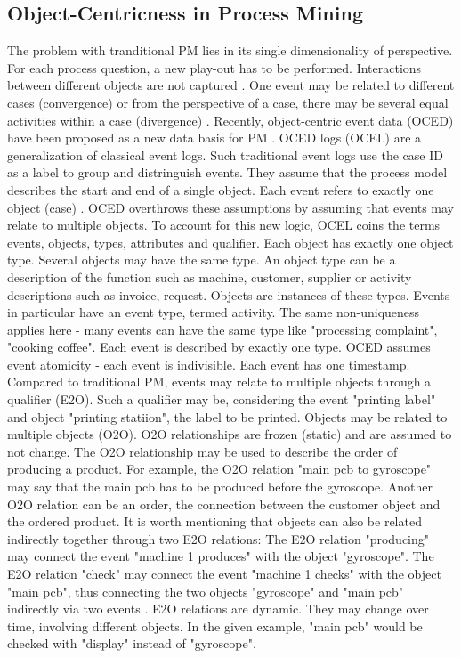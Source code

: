
\subsection{Object-Centricness in Process Mining}
\label{sec:object-centric-event-logs}

The problem with tranditional PM lies in its single dimensionality of perspective. For each process question, a new play-out has to be performed. Interactions between different objects are not captured \autocite{van2023object}. One event may be related to different cases (convergence) or from the perspective of a case, there may be several equal activities within a case (divergence) \autocite{van2019object}.
Recently, object-centric event data (OCED) have been proposed as a new data basis for PM \autocite{van2019object}. OCED logs (OCEL) are a generalization of classical event logs. Such traditional event logs use the case ID as a label to group and distringuish events. They assume that the process model describes the start and end of a single object. Each event refers to exactly one object (case) \autocite{van2023object}. OCED overthrows these assumptions by assuming that events may relate to multiple objects. To account for this new logic, OCEL coins the terms events, objects, types, attributes and qualifier. Each object has exactly one object type. Several objects may have the same type. An object type can be a description of the function such as machine, customer, supplier or activity descriptions such as invoice, request. Objects are instances of these types. Events in particular have an event type, termed activity. The same non-uniqueness applies here - many events can have the same type like "processing complaint", "cooking coffee". Each event is described by exactly one type. OCED assumes event atomicity - each event is indivisible. Each event has one timestamp. Compared to traditional PM, events may relate to multiple objects through a qualifier (E2O). Such a qualifier may be, considering the event "printing label" and object "printing statiion", the label to be printed. Objects may be related to multiple objects (O2O). O2O relationships are frozen (static) and are assumed to not change. The O2O relationship may be used to describe the order of producing a product. For example, the O2O relation "main pcb to gyroscope" may say that the main pcb has to be produced before the gyroscope. Another O2O relation can be an order, the connection between the customer object and the ordered product. It is worth mentioning that objects can also be related indirectly together through two E2O relations: The E2O relation "producing" may connect the event "machine 1 produces" with the object "gyroscope". The E2O relation "check" may connect the event "machine 1 checks" with the object "main pcb", thus connecting the two objects "gyroscope" and "main pcb" indirectly via two events \autocite{van2019object}. E2O relations are dynamic. They may change over time, involving different objects. In the given example, "main pcb" would be checked with "display" instead of "gyroscope".

